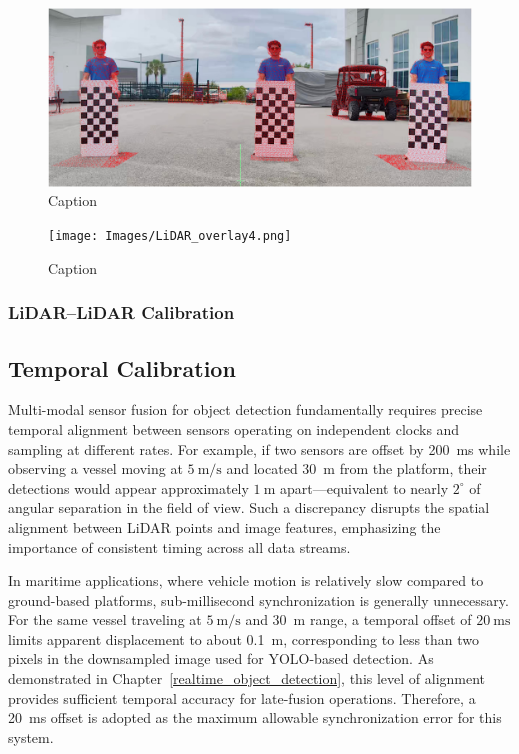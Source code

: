 \documentclass{erauthesis}
\begin{document}
\begin{figure}[htbp]
    \centering
    \includegraphics[width=0.8\linewidth]{Images/LiDAR_overlay2.png}
    \caption{Caption}
    \label{fig:LiDAR_overlay2}
\end{figure}

\begin{figure}[htbp]
    \centering
    \texttt{[image: Images/LiDAR\_overlay4.png]}
    \caption{Caption}
    \label{fig:LiDAR_overlay4}
\end{figure}


\subsubsection{LiDAR–LiDAR Calibration} \label{lidarLidar_calib}
\subsection{Temporal Calibration}
\label{time_sync}

Multi-modal sensor fusion for object detection fundamentally requires precise temporal alignment between sensors operating on independent clocks and sampling at different rates.  
For example, if two sensors are offset by 200~ms while observing a vessel moving at $5~\mathrm{m/s}$ and located 30~m from the platform, their detections would appear approximately $1~\mathrm{m}$ apart—equivalent to nearly $2^{\circ}$ of angular separation in the field of view.  
Such a discrepancy disrupts the spatial alignment between LiDAR points and image features, emphasizing the importance of consistent timing across all data streams.

In maritime applications, where vehicle motion is relatively slow compared to ground-based platforms, sub-millisecond synchronization is generally unnecessary.  
For the same vessel traveling at $5~\mathrm{m/s}$ and 30~m range, a temporal offset of $20~\mathrm{ms}$ limits apparent displacement to about 0.1~m, corresponding to less than two pixels in the downsampled image used for YOLO-based detection.  
As demonstrated in Chapter~\ref{realtime_object_detection}, this level of alignment provides sufficient temporal accuracy for late-fusion operations.
Therefore, a 20~ms offset is adopted as the maximum allowable synchronization error for this system.
\end{document}

